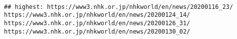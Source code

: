 \documentclass[
]{article}
\begin{document}
\begin{verbatim}
                                                                                                                                                                                                                                                                                                                                                                                                                                                                                                                                                                                                                                                                                                                    
## highest: https://www3.nhk.or.jp/nhkworld/en/news/20200116_23/                                                                                                                                                                                                                                                                                                                                                                                                                                                                                                                                                                                                                                                                                                                                                                            https://www3.nhk.or.jp/nhkworld/en/news/20200124_14/                                                                                                                                                                                                                                                                                                                                                                                                                                                                                                                                                                                                                                                                                                                                                                            https://www3.nhk.or.jp/nhkworld/en/news/20200126_31/                                                                                                                                                                                                                                                                                                                                                                                                                                                                                                                                                                                                                                                                                                                                                                            https://www3.nhk.or.jp/nhkworld/en/news/20200130_02/                                                                                                                                                                  
\end{verbatim}
\end{document}
